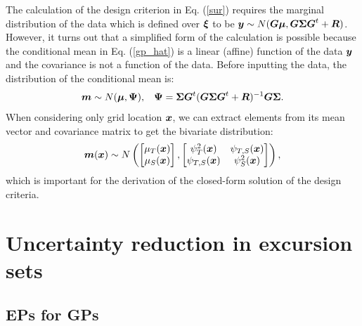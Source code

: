 \documentclass[aoas]{imsart}
\begin{document}
The calculation of the design criterion in Eq. (\ref{sur}) requires
the marginal distribution of the data which is defined over ${\boldsymbol \xi}$ to
be ${\boldsymbol y} \sim N( {\boldsymbol G} {\boldsymbol \mu},{\boldsymbol G} {\boldsymbol \Sigma} {\boldsymbol G}^t+{\boldsymbol R})$.  However, it turns
out that a simplified form of the calculation is possible because the
conditional mean in Eq. (\ref{gp_hat}) is a linear (affine) function of
the data ${\boldsymbol y}$ and the covariance is not a function of the data.
Before inputting the data, the distribution of the conditional mean is:
\begin{equation}\label{distxi} \bm \sim N(\bmu , \bPsi), \hspace{3mm}
  \bPsi=\bSigma \bG^t (\bG \bSigma \bG^t+\bR)^{-1} \bG \bSigma.
\end{equation} 
When considering only grid location ${\boldsymbol x}$, we can
extract elements from its mean vector and covariance matrix to get the
bivariate distribution:
\begin{equation}\label{dist_mxi}
  \bm(\bx) \sim N \left( \begin{bmatrix}
      \mu_{T}(\bx) \\
      \mu_{S}(\bx) \end{bmatrix}, \begin{bmatrix}
      \psi^2_{T}(\bx) & \psi_{T,S}(\bx)\\
      \psi_{T,S}(\bx) & \psi^2_{S}(\bx) \end{bmatrix} \right),
\end{equation}
which is important for the derivation of the closed-form solution of the design criteria.

\section{Uncertainty reduction in excursion sets}
\label{sec:sur}

\subsection{EPs for GPs}
\end{document}
